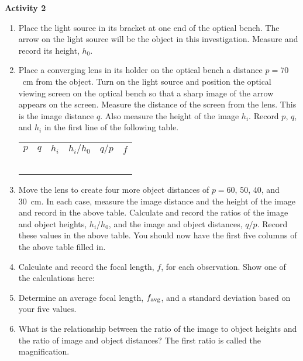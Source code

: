 \pagebreak[2]
\textbf{Activity 2 }

\begin{enumerate}[labparts]
\item Place the light source in its bracket at one end of the optical bench. 
The arrow on the light source will be the object in this investigation. Measure
and record its height, $h_0$.\vspace{10mm}

\item Place a converging lens in its holder on the optical bench a distance $p=70$~cm from the object.  Turn on the light source and position the optical viewing screen on the optical bench so that a sharp image of the arrow appears on the screen. Measure the distance of the screen from the lens. This is the image distance $q$. Also measure the height of the image $h_i$. Record $p$, $q$, and $h_i$ in the first line of the following table.
\vspace{0.3cm}

\begin{center}
{\renewcommand{\arraystretch}{1.5}
\begin{tabular}{*{6}{|C{0.7in}}|}
\hline
$p$ & 
$q$ & 
$h_i$ & 
${h_i} / {h_0}$ &
${q} / {p}$ &
$f$ \\
\hhline{|=|=|=|=|=|=|}
& & & & &\\
\hline 
& & & & &\\
\hline 
& & & & &\\
\hline 
& & & & &\\
\hline 
& & & & &\\
\hline 
\end{tabular}
}
\end{center}
\vspace{0.3cm}

\item Move the lens to create four more object distances of $p=60$, 50, 40, and 30~cm. In each case, measure the image distance and the height of the image and record in the above table. Calculate and record the ratios of the image and object heights, $h_i / h_0$, and the image and object distances, $q / p$. Record these values in the above table. You should now have the first five columns of the above table filled in.

\item Calculate and record the focal length, $f$, for each observation. Show one of the calculations here:
\answerspace{30mm}

\item Determine an average focal length, $f_{\rm avg}$, and a standard
deviation based on your five values.
\answerspace{30mm}

\item What is the relationship between the ratio of the image to object
heights and the ratio of image and object distances? The first ratio
is called the magnification.\vspace{15mm}


\end{enumerate}

